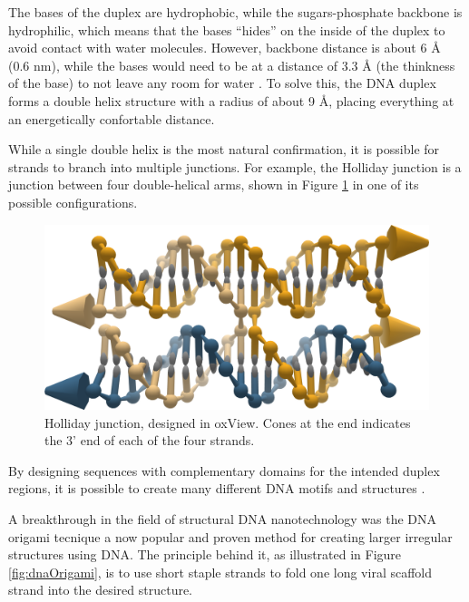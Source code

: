 The bases of the duplex are hydrophobic, while the sugars-phosphate backbone is hydrophilic, which means that the bases ``hides'' on the inside of the duplex to avoid contact with water molecules. However, backbone distance is about 6 Å (0.6 nm), while the bases would need to be at a distance of 3.3 Å (the thinkness of the base) to not leave any room for water \cite{calladine1997understanding}. To solve this, the DNA duplex forms a double helix structure with a radius of about 9 Å, placing everything at an energetically confortable distance.

While a single double helix is the most natural confirmation, it is possible for strands to branch into multiple junctions. For example, the Holliday junction is a junction between four double-helical arms, shown in Figure \ref{fig:holliday} in one of its possible configurations.

\begin{figure}
    \centering\includegraphics[width=\textwidth]{figures/holliday.png}
    \caption{Holliday junction, designed in oxView. Cones at the end indicates the 3' end of each of the four strands.}
    \label{fig:holliday}
\end{figure}



By designing sequences with complementary domains for the intended duplex regions, it is possible to create many different DNA motifs and structures \cite{seeman_2016}.


A breakthrough in the field of structural DNA nanotechnology was the DNA origami tecnique \cite{rothemund2006folding} a now popular and proven method for creating larger irregular structures using DNA. The principle behind it, as illustrated in Figure \ref{fig:dnaOrigami}, is to use short staple strands to fold one long viral scaffold strand into the desired structure.

